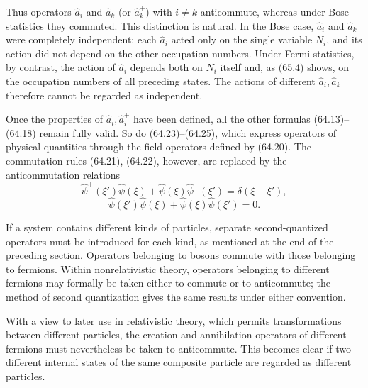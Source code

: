 Thus operators $\hat a_i$ and $\hat a_k$ (or $\hat a_k^+$) with $i\ne k$
anticommute, whereas under Bose statistics they commuted. This distinction is
natural. In the Bose case, $\hat a_i$ and $\hat a_k$ were completely
independent: each $\hat a_i$ acted only on the single variable $N_i$, and its
action did not depend on the other occupation numbers. Under Fermi statistics,
by contrast, the action of $\hat a_i$ depends both on $N_i$ itself and, as
(65.4) shows, on the occupation numbers of all preceding states. The actions
of different $\hat a_i,\hat a_k$ therefore cannot be regarded as independent.

Once the properties of $\hat a_i,\hat a_i^+$ have been defined, all the other
formulas (64.13)--(64.18) remain fully valid. So do (64.23)--(64.25), which
express operators of physical quantities through the field operators defined
by (64.20). The commutation rules (64.21), (64.22), however, are replaced by
the anticommutation relations
\begin{equation}
 \hat\psi^+(\xi')\hat\psi(\xi)+\hat\psi(\xi)\hat\psi^+(\xi')
 =\delta(\xi-\xi'),
 \tag{65.11}
\end{equation}
\begin{equation}
 \hat\psi(\xi')\hat\psi(\xi)+\hat\psi(\xi)\hat\psi(\xi')=0.
 \tag{65.12}
\end{equation}

If a system contains different kinds of particles, separate second-quantized
operators must be introduced for each kind, as mentioned at the end of the
preceding section. Operators belonging to bosons commute with those belonging
to fermions. Within nonrelativistic theory, operators belonging to different
fermions may formally be taken either to commute or to anticommute; the method
of second quantization gives the same results under either convention.

With a view to later use in relativistic theory, which permits transformations
between different particles, the creation and annihilation operators of
different fermions must nevertheless be taken to anticommute. This becomes
clear if two different internal states of the same composite particle are
regarded as different particles.
